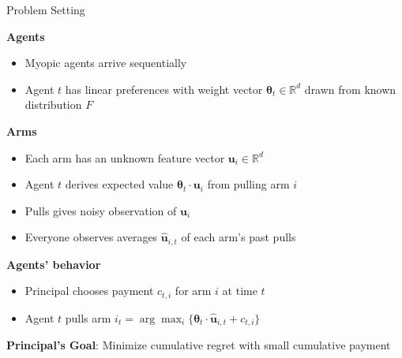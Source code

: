 \documentclass[serif]{beamer}
\begin{document}
\begin{frame}{Problem Setting}

\textbf{Agents}
\begin{itemize}
\item Myopic agents arrive sequentially
\item Agent $t$ has linear preferences with weight vector $\bm{\theta}_t\in \mathbb{R}^{d}$ drawn from known distribution $F$
\end{itemize}
\vspace{0.5cm}

\textbf{Arms}
\begin{itemize}
\item Each arm has an unknown feature vector $\bm{u}_i\in \mathbb{R}^{d}$
\item Agent $t$ derives expected value $\bm{\theta}_{t}\cdot \bm{u}_{i}$ from pulling arm $i$
\item Pulls gives noisy observation of $\bm{u}_i$ 
\item Everyone observes averages $\hat{\bm{u}}_{i,t}$ of each arm's past pulls
\end{itemize}

\vspace{0.5cm}
\textbf{Agents' behavior}
\begin{itemize}
\item Principal chooses payment $c_{t,i}$ for arm $i$ at time $t$
\item Agent $t$ pulls arm $i_t = \arg\max_{i}\{\bm{\theta}_{t}\cdot \hat{\bm{u}}_{i,t}+c_{t,i}\}$
\end{itemize}



\vspace{0.5cm}

\textbf{Principal's Goal}: Minimize cumulative regret with small cumulative payment

\end{frame}

\end{document}
